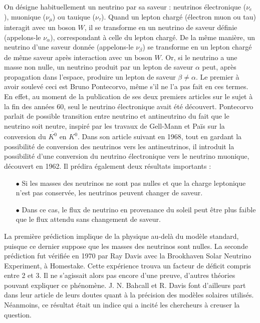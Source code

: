       On désigne habituellement un neutrino par sa saveur : neutrinos électronique ($\nu_e$), muonique ($\nu_{\mu}$) ou tauique ($\nu_{\tau}$). Quand un lepton chargé (électron muon ou tau) interagit avec un boson $W$, il se transforme en un neutrino de saveur définie (appelons-le $\nu_{\alpha}$), correspondant à celle du lepton chargé. De la même manière, un neutrino d'une saveur donnée (appelons-le $\nu_{\beta}$) se transforme en un lepton chargé de même saveur après interaction avec un boson $W$. Or, si le neutrino a une masse non nulle, un neutrino produit par un lepton de saveur $\alpha$ peut, après propagation dans l'espace, produire un lepton de saveur $\beta\ne\alpha$. Le premier à avoir soulevé ceci est Bruno Pontecorvo, même s'il ne l'a pas fait en ces termes. En effet, au moment de la publication de ses deux premiers articles\cite{Pontecorvo:1957cp,Pontecorvo:1957qd} sur le sujet à la fin des années 60, seul le neutrino électronique avait été découvert. Pontecorvo parlait de possible transition entre neutrino et antineutrino du fait que le neutrino soit neutre, inspiré par les travaux de Gell-Mann et Païs\cite{Gell-Mann1955} sur la conversion du $\overline{K^0}$ en  $K^0$. Dans son article suivant en 1968\cite{Pontecorvo1968}, tout en gardant la possibilité de conversion des neutrinos vers les antineutrinos, il introduit la possibilité d'une conversion du neutrino électronique vers le neutrino muonique, découvert en 1962\cite{Danby1962}. Il prédira également deux résultats importants :
      \begin{itemize}
        \item[$\bullet$] Si les masses des neutrinos ne sont pas nulles et que la charge leptonique n'est pas conservée, les neutrinos peuvent changer de saveur.
        \item[$\bullet$] Dans ce cas, le flux de neutrino en provenance du soleil peut être plus faible que le flux attendu sans changement de saveur.
      \end{itemize}
      La première prédiction implique de la physique au-delà du modèle standard, puisque ce dernier suppose que les masses des neutrinos sont nulles. La seconde prédiction fut vérifiée en 1970 par Ray Davis avec la Brookhaven Solar Neutrino Experiment\cite{Bahcall1976}, à Homestake. Cette expérience trouva un facteur de déficit compris entre 2 et 3. Il ne s'agissait alors pas encore d'une preuve, d'autres théories pouvant expliquer ce phénomène. J. N. Bahcall et R. Davis font d'ailleurs part dans leur article\cite{Bahcall1976} de leurs doutes quant à la précision des modèles solaires utilisés. Néanmoins, ce résultat était un indice qui a incité les chercheurs à creuser la question.

